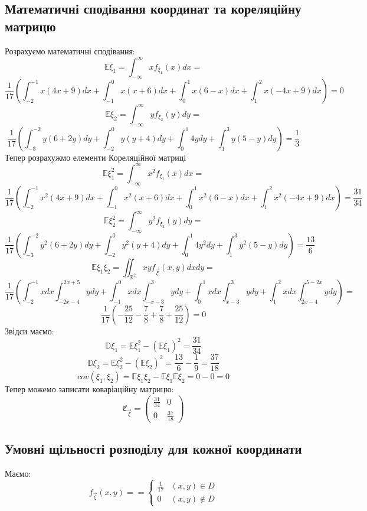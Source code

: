 \documentclass{article}
\begin{document}
	\newpage
	\subsection{Математичні сподівання координат та кореляційну матрицю}
	Розрахуємо математичні сподівання:
	\[
	\mathbb{E}\xi_1 = \int_{-\infty}^\infty x f_{\xi_1}(x)dx = 
	\]
	\[
	\frac{1}{17}\left( \int_{-2}^{-1}x(4x+9)dx + \int_{-1}^{0}x(x+6)dx + \int_{0}^{1}x(6-x)dx + \int_{1}^{2}x(-4x+9)dx \right) = 0
	\]
	\bigskip
	\[
	\mathbb{E}\xi_2 = \int_{-\infty}^\infty y f_{\xi_2}(y)dy = 
	\]
	\[
	\frac{1}{17}\left( \int_{-3}^{-2} y(6+2y)dy + \int_{-2}^{0}y(y+4)dy + \int_{0}^1 4ydy + \int_1^3y(5-y)dy \right) = \frac{1}{3}
	\]
	Тепер розрахужмо елементи Кореляційної матриці
	\[
	\mathbb{E}\xi_1^2 = \int_{-\infty}^\infty x^2 f_{\xi_1}(x)dx = 
	\]
	\[
	\frac{1}{17}\left( \int_{-2}^{-1}x^2(4x+9)dx + \int_{-1}^{0}x^2(x+6)dx + \int_{0}^{1}x^2(6-x)dx + \int_{1}^{2}x^2(-4x+9)dx \right) = \frac{31}{34}
	\]
	\bigskip
	\[
	\mathbb{E}\xi_2^2 = \int_{-\infty}^\infty y^2 f_{\xi_2}(y)dy = 
	\]
	\[
	\frac{1}{17}\left( \int_{-3}^{-2} y^2(6+2y)dy + \int_{-2}^{0}y^2(y+4)dy + \int_{0}^1 4y^2dy + \int_1^3y^2(5-y)dy \right) = \frac{13}{6}
	\]
	\bigskip
	\[
	\mathbb{E}\xi_1\xi_2 = \iint_{\mathbb{R}^2}xyf_{\overrightarrow{\xi}}(x, y) dxdy = 
	\]
	\[
		\frac{1}{17} \left( \int_{-2}^{-1}xdx\int_{-2x-4}^{2x+5}ydy + \int_{-1}^0xdx\int_{-x-3}^3 ydy + \int_0^1xdx\int_{x-3}^3ydy + \int_1^2xdx\int_{2x-4}^{5-2x}ydy \right) = 
	\]
	\[
	\frac{1}{17}\left(-\frac{25}{12} - \frac{7}{8} + \frac{7}{8} + \frac{25}{12} \right) = 0
	\]
	Звідси маємо:
	\[
	\mathbb{D}\xi_1 = \mathbb{E}\xi_1^2 - (\mathbb{E}\xi_1)^2 =  \frac{31}{34}
	\]
	\[
	\mathbb{D}\xi_2 = \mathbb{E}\xi_2^2 - (\mathbb{E}\xi_2)^2 = \frac{13}{6} - \frac{1}{9} = \frac{37}{18}
	\]
	\[
	cov(\xi_1, \xi_2) = \mathbb{E}\xi_1\xi_2 - \mathbb{E}\xi_1\mathbb{E}\xi_2 = 0 - 0 = 0
	\]
	Тепер можемо записати  коваріаційну матрицю:
	\[
	\mathfrak{C}_{\overrightarrow{\xi}} = 
	\begin{pmatrix}
		\frac{31}{34} & 0 \\
		0 & \frac{37}{18} 
	\end{pmatrix}
	\]
	\subsection{Умовні щільності розподілу для кожної координати}
	Маємо:
	$$
	f_{\overrightarrow{\xi}}(x, y) = 
	=
	\begin{cases}
		\frac{1}{17} & (x,y) \in D \\
		0 &  (x,y) \notin D
	\end{cases}
	$$ 
	
\end{document}
